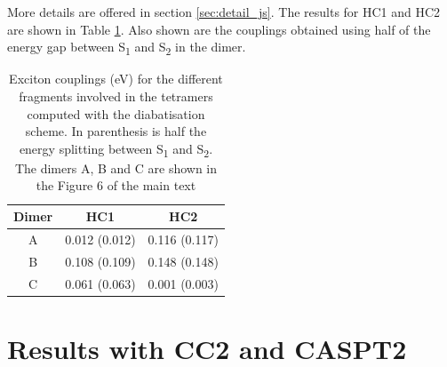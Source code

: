 More details are offered in section \ref{sec:detail_js}. The results for HC1 and HC2 are shown in Table \ref{tab:couplings}. Also shown are the couplings obtained using half of the energy gap between S\textsubscript{1} and S\textsubscript{2} in the dimer.

\begin{table}[H]
\centering
\caption{Exciton couplings (eV) for the different fragments involved in the tetramers computed with the diabatisation scheme. In parenthesis is half the energy splitting between S\textsubscript{1} and S\textsubscript{2}.  The dimers A, B and C are shown in the Figure 6 of the main text} 
\label{tab:couplings}
\begin{tabular}{ccc}
\toprule
\textbf{Dimer} & \textbf{HC1} & \textbf{HC2}\\\midrule
A & 0.012 (0.012) & 0.116 (0.117)\\
B & 0.108 (0.109) & 0.148 (0.148)\\
C & 0.061 (0.063) & 0.001 (0.003)\\\bottomrule
\end{tabular}
\end{table}
\section{Results with CC2 and CASPT2}
\label{app:sec:cc2_caspt2}

